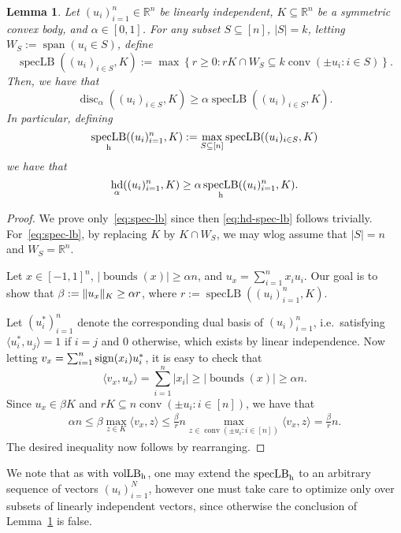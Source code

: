\documentclass[12pt]{article}
\newtheorem{lemma}{Lemma}
\newcommand{\R}{{\mathbb{R}}}
\newcommand{\inner}[2]{\langle #1, #2 \rangle}
\newcommand{\set}[1]{\left\{ #1 \right\}}
\DeclareMathOperator{\vollb}{volLB}
\DeclareMathOperator{\disc}{disc}
\DeclareMathOperator{\hd}{hd}
\DeclareMathOperator{\conv}{conv}
\DeclareMathOperator{\lspan}{span}
\DeclareMathOperator{\speclb}{specLB}
\DeclareMathOperator{\bnds}{bounds}
\DeclarePairedDelimiter\norm{\lVert}{\rVert}
\begin{document}
\begin{lemma}
\label{lem:speclb}
Let $(u_i)_{i=1}^n \in \R^n$ be linearly independent, $K \subseteq \R^n$ be a
symmetric convex body, and $\alpha \in [0,1]$. For any subset $S \subseteq [n]$,
$|S|=k$, letting $W_S := \lspan(u_i \in S)$, define
\[
\speclb((u_i)_{i \in S},K) := 
\max \set{r \geq 0: r K \cap W_S \subseteq k \conv(\pm u_i: i \in S)}.
\]
Then, we have that
\begin{equation}
\label{eq:spec-lb}
\disc_\alpha((u_i)_{i \in S},K) \geq \alpha \speclb((u_i)_{i \in S},K).
\end{equation}
In particular, defining
\[
\speclb_{\rm h}((u_i)_{i=1}^n,K) := \max_{S \subseteq [n]} \speclb((u_i)_{i \in
S},K)
\]
we have that
\begin{equation}
\label{eq:hd-spec-lb}
\hd_{\alpha}((u_i)_{i=1}^n,K) \geq \alpha \speclb_{\rm h}((u_i)_{i=1}^n,K).
\end{equation}
\end{lemma}
\begin{proof}
We prove only~\eqref{eq:spec-lb} since then \eqref{eq:hd-spec-lb} follows
trivially. For~\eqref{eq:spec-lb}, by replacing $K$ by $K \cap W_S$, we may wlog
assume that $|S|=n$ and $W_S = \R^n$. 

Let $x \in [-1,1]^n$, $|\bnds(x)| \geq \alpha n$, and $u_x = \sum_{i=1}^n x_i
u_i$. Our goal is to show that $\beta := \norm{u_x}_K \geq \alpha r$, where $r
:= \speclb((u_i)_{i=1}^n,K)$.

Let $(u_i^*)_{i=1}^n$ denote the corresponding dual basis of
$(u_i)_{i=1}^n$, i.e.~satisfying $\inner{u_i^*}{u_j} = 1$ if $i=j$ and $0$
otherwise, which exists by linear independence. Now letting $v_x =
\sum_{i=1}^n {\rm sign}(x_i) u_i^*$, it is easy to check that 
\[
\inner{v_x}{u_x} = \sum_{i=1}^n |x_i| \geq |\bnds(x)| \geq \alpha n .
\]
Since $u_x \in \beta K$ and $r K \subseteq n \conv(\pm u_i: i
\in [n])$, we have that
\begin{align*}
\alpha n \leq \beta \max_{z \in K} \inner{v_x}{z} 
         \leq \frac{\beta}{r} n 
               \max_{z \in \conv(\pm u_i: i \in [n])} \inner{v_x}{z}
          = \frac{\beta}{r} n .
\end{align*}
The desired inequality now follows by rearranging.
\end{proof}

We note that as with $\vollb_{\rm h}$, one may extend the $\speclb_{\rm h}$ to
an arbitrary sequence of vectors $(u_i)_{i=1}^N$, however one must take care to
optimize only over subsets of linearly independent vectors, since otherwise the
conclusion of Lemma~\ref{lem:speclb} is false.
\end{document}

